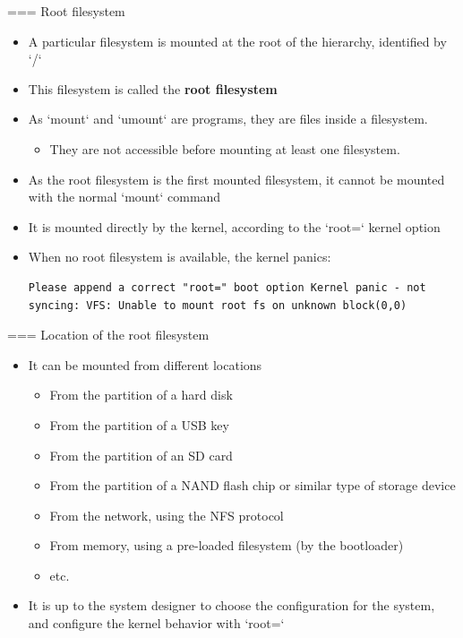 === Root filesystem
  \begin{itemize}
  \item A particular filesystem is mounted at the root of the hierarchy,
    identified by `/`
  \item This filesystem is called the {\bf root filesystem}
  \item As `mount` and `umount` are programs, they are files
    inside a filesystem.
    \begin{itemize}
    \item They are not accessible before mounting at least one filesystem.
    \end{itemize}
  \item As the root filesystem is the first mounted filesystem, it
    cannot be mounted with the normal `mount` command
  \item It is mounted directly by the kernel, according to the
    `root=` kernel option
  \item When no root filesystem is available, the kernel panics:\\
    \small
\begin{verbatim}
Please append a correct "root=" boot option Kernel panic - not syncing: VFS: Unable to mount root fs on unknown block(0,0)
\end{verbatim}
  \end{itemize}


=== Location of the root filesystem
  \begin{itemize}
  \item It can be mounted from different locations
    \begin{itemize}
    \item From the partition of a hard disk
    \item From the partition of a USB key
    \item From the partition of an SD card
    \item From the partition of a NAND flash chip or similar type of
      storage device
    \item From the network, using the NFS protocol
    \item From memory, using a pre-loaded filesystem (by the
      bootloader)
    \item etc.
    \end{itemize}
  \item It is up to the system designer to choose the configuration
    for the system, and configure the kernel behavior with
    `root=`
  \end{itemize}


